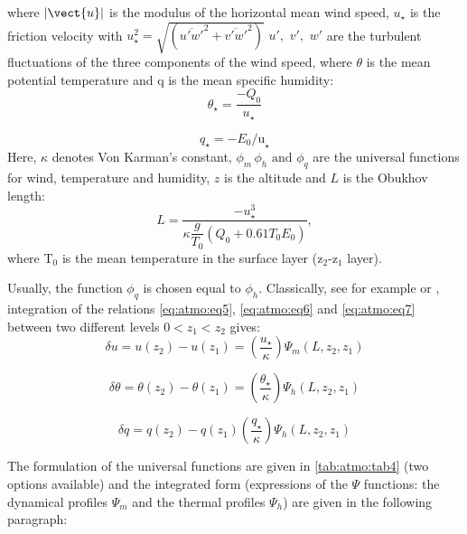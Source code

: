 where $\left| {\vect{u}} \right|$ is the modulus of the horizontal mean wind speed,
\newline
$u_\star $ is the friction velocity with $u_{\star}^{2} =\sqrt{(\overline{u'w'}^{2}+\overline{v'w'}^{2})}$
\newline
$u',\,\,v',\,\,w'$ are the turbulent fluctuations of the three components of the wind speed,
\newline
where $\theta$ is the mean potential temperature and q is the mean specific humidity:
\begin{equation}
\theta_{\star}=\frac{-Q_{0}}{u_{\star}}
\end{equation}

\begin{equation}
q_{\star} =-E_{0} \mbox{/u}_{\star}
\end{equation}
\newline
Here, $\kappa$ denotes Von Karman's constant, $\phi_{m} \, \phi_{h} \,\,\mbox{and}\,\,\phi_{q} $
are the universal functions for wind, temperature and humidity, $z$ is the
altitude and $L$ is the Obukhov length:
\begin{equation}
\label{eq:atmo:eq8}
L = \dfrac{-u_{\star}^{3}}{
  \kappa \dfrac{g}{T_{0}} \left( Q_{0}
  +0.61 T_{0} E_{0} \right)
},
\end{equation}
where T$_{0}$ is the mean temperature in the surface layer (z$_{2}$-z$_{1}$
layer).

Usually, the function $\phi_{q} $ is chosen equal to $\phi
_{h} $. Classically, see for example \cite{Garratt:1992} or \cite{Cheng:2005},
integration of the relations \eqref{eq:atmo:eq5}, \eqref{eq:atmo:eq6} and \eqref{eq:atmo:eq7}
between two different levels $0<z_{1} <z_{2} $ gives:
\begin{equation}
\label{eq:atmo:eq9}
\delta u=u(z_2)-u(z_1)=
\left(\frac {u_{\star}}{\kappa} \right)\Psi_{m}\left({L,z_2,z_1} \right)
\end{equation}

\begin{equation}
\label{eq:atmo:eq10}
\delta \theta=\theta (z_2) -\theta (z_1)=
\left(\frac{\theta_{\star}}{\kappa} \right)\Psi_{h}\left({L,z_2,z_1} \right)
\end{equation}

\begin{equation}
\label{eq:atmo:eq11}
\delta q=q(z_2)-q(z_1)
\left( {\frac{q_{\star}}{\kappa}} \right)\Psi_{h} \left({L,z_2,z_1} \right)
\end{equation}

The formulation of the universal functions are given in \tablename{} \ref{tab:atmo:tab4} (two
options available) and the integrated form (expressions of the $\Psi$ functions:
the dynamical profiles $\Psi_{m}$ and the thermal profiles $\Psi_{h}$) are given in the following paragraph:

